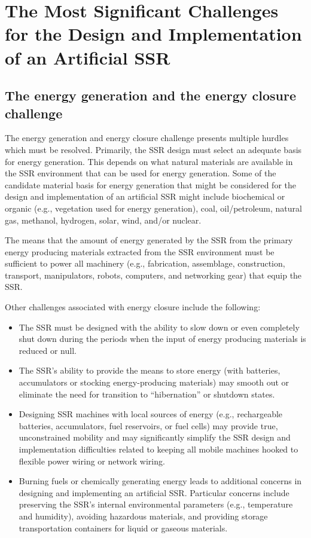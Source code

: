\section[The Most Significant Challenges]{The Most Significant Challenges for the Design and Implementation of an Artificial SSR}


\subsection[The energy generation and the energy closure challenge]{The
energy generation and the energy closure challenge}

The energy generation and energy closure challenge presents multiple
hurdles which must be resolved.  
Primarily, the SSR design must select an adequate basis for energy generation.
This depends on what natural materials are available in
the SSR environment that can be used for energy generation.  
Some of the candidate material basis for energy
generation that might be considered for the design and implementation
of an artificial SSR might include biochemical or organic (e.g., vegetation used for energy generation), coal, oil/petroleum, natural gas, methanol, hydrogen, solar, wind, and/or nuclear.

The  means that the amount of
energy generated by the SSR from the primary energy producing materials
extracted from the SSR environment must be sufficient to power
all machinery (e.g., fabrication, assemblage, construction, transport,
manipulators, robots, computers, and networking gear) that equip the
SSR.

Other challenges associated with energy closure include the following:

\begin{itemize}
\item The SSR must be designed with the ability to slow down or even
completely shut down during the periods when the input of energy
producing materials is reduced or null.
\item The SSR's ability to provide the means to store energy (with batteries,
accumulators or stocking energy-producing materials) may smooth out or
eliminate the need for transition to “hibernation” or shutdown states.
\item Designing SSR machines with local sources of energy (e.g., 
rechargeable batteries, accumulators, fuel reservoirs, or fuel cells)
may provide true, unconstrained mobility and
may significantly simplify the SSR design and implementation
difficulties related to keeping all mobile machines hooked to flexible
power wiring or network wiring.
\item Burning fuels or chemically generating energy leads to additional concerns in designing and implementing an artificial SSR. Particular concerns include preserving the SSR’s internal environmental parameters (e.g., temperature and humidity), avoiding hazardous materials, and providing storage transportation containers for liquid or gaseous materials.
\end{itemize}

